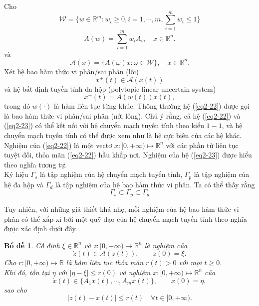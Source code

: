 \documentclass[14pt,a4paper,oneside]{report}		%
\newtheorem{lemma}[theorem]{Bổ đề}
\theoremstyle{definition}
\begin{document}
Cho
$$\mathcal{W} = \{ w\in\mathbb{R}^m:w_i \geq 0,  i=1,\cdots ,m,\sum_{i=1}^m w_i \leq 1 \}$$
\begin{equation} \label{2-20}
A(w) = \sum_{i=1}^m w_iA_i,\quad x\in\mathbb{R}^n.
\end{equation}
và
\begin{equation} \label{eq2-21}
\mathcal{A}(x)=\{A(\omega)x:\omega\in\mathcal{W}\},\quad x\in\mathbb{R}^n.
\end{equation}
Xét hệ bao hàm thức vi phân/sai phân (lồi)
\begin{equation} \label{eq2-22}
x^+(t)\in\mathcal{A}(x(t))
\end{equation}
và hệ bất định tuyến tính đa hộp (polytopic linear uncertain system)
\begin{equation} \label{eq2-23}
x^+(t)=A(w(t))x(t),
\end{equation}
trong đó $w(\cdot)$ là hàm liên tục từng khúc. Thông thường hệ (\ref{eq2-22}) được gọi là bao hàm thức vi phân/sai phân (nới lỏng). Chú ý rằng, cả hệ (\ref{eq2-22}) và (\ref{eq2-23}) có thể kết nối với hệ chuyển mạch tuyến tính theo kiểu $1-1$, và hệ chuyển mạch tuyến tính có thể được xem như là hệ cực biên của các hệ khác.\\
Nghiệm của (\ref{eq2-22}) là một vectơ $x:[0,+\infty)\mapsto\mathbb{R}^n$ với các phần tử liên tục tuyệt đối, thỏa mãn (\ref{eq2-22}) hầu khắp nơi. Nghiệm của hệ (\ref{eq2-23}) được hiểu theo nghĩa tương tự.\\
Ký hiệu $\Gamma_s$ là tập nghiệm của hệ chuyển mạch tuyến tính, $\Gamma_p$ là tập nghiệm của hệ đa hộp và $\Gamma_d$ là tập nghiệm của hệ bao hàm thức vi phân. Ta có thể thấy rằng 
$$\Gamma_s\subset\Gamma_p\subset\Gamma_d$$

Tuy nhiên, với những giả thiết khá nhẹ, mỗi nghiệm của hệ bao hàm thức vi phân có thể xấp xỉ bởi một quỹ đạo của hệ chuyển mạch tuyến tính theo nghĩa được xác định dưới đây.

\begin{lemma} \label{le1}
Cố định $\xi\in\mathbb{R}^n$ và $z:[0,+\infty)\mapsto\mathbb{R}^n$ là nghiệm của
$$\dot{z}(t)\in\mathcal{A}(z(t)), \qquad z(0)=\xi.$$
Cho $r:[0,+\infty)\mapsto\mathbb{R}$ là hàm liên tục thỏa mãn $r(t)>0$ với mọi $t\geq 0$.\\
Khi đó, tồn tại $\eta$ với $|\eta - \xi|\leq r(0)$ và nghiệm $x:[0,+\infty)\mapsto\mathbb{R}^n$ của
$$\dot{x}(t)\in\{A_1x(t),\cdots,A_mx(t)\},\qquad x(0)=\eta,$$
sao cho
$$|z(t)-x(t)|\leq r(t)\quad\forall t\in[0,+\infty).$$
\end{lemma}
\end{document}
